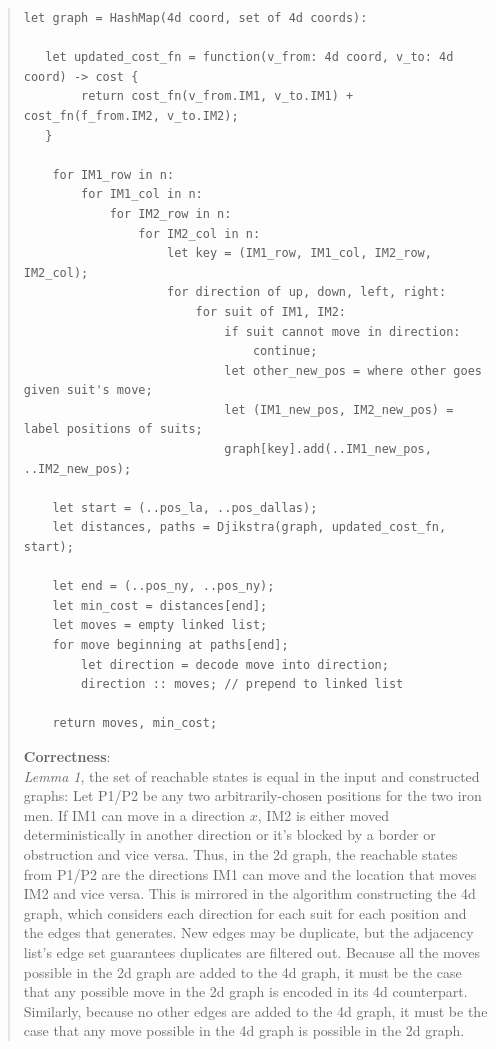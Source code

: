 \documentclass[11pt]{article}
\begin{document}
\begin{enumerate}
\begin{enumerate}
\begin{quote}
\begin{Verbatim}[xleftmargin=-6em]
   let graph = HashMap(4d coord, set of 4d coords):

   let updated_cost_fn = function(v_from: 4d coord, v_to: 4d coord) -> cost {
        return cost_fn(v_from.IM1, v_to.IM1) + cost_fn(f_from.IM2, v_to.IM2);
   }
    
    for IM1_row in n:
        for IM1_col in n:
            for IM2_row in n:
                for IM2_col in n:
                    let key = (IM1_row, IM1_col, IM2_row, IM2_col); 
                    for direction of up, down, left, right:
                        for suit of IM1, IM2:    
                            if suit cannot move in direction:
                                continue;
                            let other_new_pos = where other goes given suit's move;
                            let (IM1_new_pos, IM2_new_pos) = label positions of suits;
                            graph[key].add(..IM1_new_pos, ..IM2_new_pos);
    
    let start = (..pos_la, ..pos_dallas);
    let distances, paths = Djikstra(graph, updated_cost_fn, start);

    let end = (..pos_ny, ..pos_ny);
    let min_cost = distances[end];
    let moves = empty linked list;
    for move beginning at paths[end];
        let direction = decode move into direction;
        direction :: moves; // prepend to linked list

    return moves, min_cost;
  \end{Verbatim}
  
  \textbf{Correctness}:\\ 
  \textit{Lemma 1}, the set of reachable states is equal in the input and constructed graphs: Let P1/P2 be any two arbitrarily-chosen positions for the two iron men. If IM1 can move in a direction $x$, IM2 is either moved deterministically in another direction or it's blocked by a border or obstruction and vice versa. Thus, in the 2d graph, the reachable states from P1/P2 are the directions IM1 can move and the location that moves IM2 and vice versa. This is mirrored in the algorithm constructing the 4d graph, which considers each direction for each suit for each position and the edges that generates. New edges may be duplicate, but the adjacency list's edge set guarantees duplicates are filtered out. Because all the moves possible in the 2d graph are added to the 4d graph, it must be the case that any possible move in the 2d graph is encoded in its 4d counterpart. Similarly, because no other edges are added to the 4d graph, it must be the case that any move possible in the 4d graph is possible in the 2d graph.


\end{quote}
\end{enumerate}
\end{enumerate}
\end{document}
